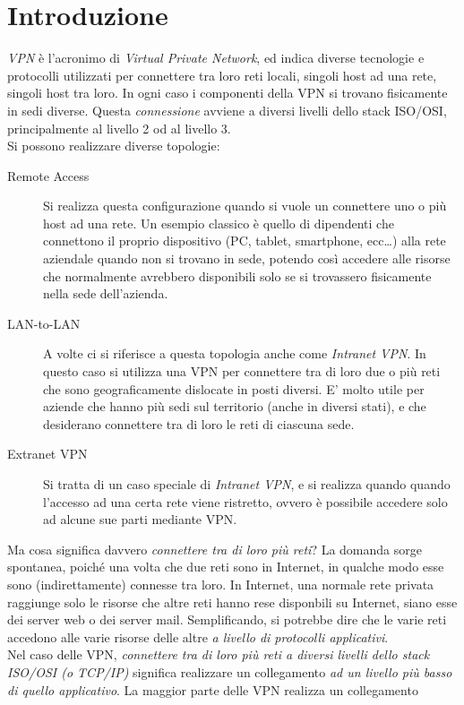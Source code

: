 \section{Introduzione}
\textit{VPN} è l'acronimo di \textit{Virtual Private Network}, ed indica diverse
tecnologie e protocolli utilizzati per connettere tra loro
reti locali, singoli host
ad una rete, singoli host tra loro. In ogni caso i componenti della VPN si trovano
fisicamente in sedi diverse. Questa \textit{connessione} avviene a diversi livelli dello stack
ISO/OSI, principalmente al livello 2 od al livello 3.\\
Si possono realizzare diverse topologie:
\begin{description}
	\item[Remote Access]Si realizza questa configurazione quando si vuole un connettere
	uno o più host ad una rete. Un esempio classico è quello di dipendenti che connettono
	il proprio dispositivo (PC, tablet, smartphone, ecc\ldots) alla rete aziendale
	quando non si trovano in sede, potendo così accedere alle risorse che normalmente
	avrebbero disponibili solo se si trovassero fisicamente nella sede dell'azienda.
	\item[LAN-to-LAN]A volte ci si riferisce a questa topologia anche come \textit{Intranet
	VPN}. In questo caso si utilizza una VPN per connettere tra di loro due o più
	reti che sono geograficamente dislocate in posti diversi. E' molto utile per aziende
	che hanno più sedi sul territorio (anche in diversi stati), e che desiderano connettere
	tra di loro le reti di ciascuna sede.
	\item[Extranet VPN]Si tratta di un caso speciale di \textit{Intranet VPN}, e si realizza
	quando quando l'accesso ad una certa rete viene ristretto, ovvero è possibile accedere
	solo ad alcune sue parti mediante VPN.
\end{description}
Ma cosa significa davvero \textit{connettere tra di loro più reti}? La domanda sorge
spontanea, poiché una volta che due reti sono in Internet, in qualche modo
esse sono (indirettamente) connesse tra loro. In Internet, una normale rete privata
raggiunge solo le risorse che altre reti hanno rese disponbili su Internet,
siano esse dei server web o dei server mail.
Semplificando, si potrebbe dire che le varie reti accedono alle varie risorse delle
altre \textit{a livello di protocolli applicativi}.\\
Nel caso delle VPN, \textit{connettere tra di loro più reti a diversi livelli dello
	stack ISO/OSI (o TCP/IP)} significa realizzare un collegamento \textit{ad un livello
più basso di quello applicativo}. La maggior parte delle VPN realizza un collegamento
